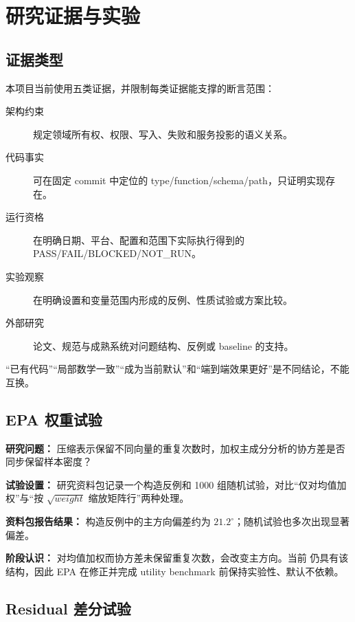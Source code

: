 \chapter{研究证据与实验}

\section{证据类型}

本项目当前使用五类证据，并限制每类证据能支撑的断言范围：

\begin{description}
\item[架构约束] 规定领域所有权、权限、写入、失败和服务投影的语义关系。
\item[代码事实] 可在固定 commit 中定位的 type/function/schema/path，只证明实现存在。
\item[运行资格] 在明确日期、平台、配置和范围下实际执行得到的 PASS/FAIL/BLOCKED/NOT\_RUN。
\item[实验观察] 在明确设置和变量范围内形成的反例、性质试验或方案比较。
\item[外部研究] 论文、规范与成熟系统对问题结构、反例或 baseline 的支持。
\end{description}

“已有代码”“局部数学一致”“成为当前默认”和“端到端效果更好”是不同结论，不能互换。\cite{nous-research-package}

\section{EPA 权重试验}

\textbf{研究问题：} 压缩表示保留不同向量的重复次数时，加权主成分分析的协方差是否同步保留样本密度？

\textbf{试验设置：} 研究资料包记录一个构造反例和 1000 组随机试验，对比“仅对均值加权”与“按 $\sqrt{weight}$ 缩放矩阵行”两种处理。

\textbf{资料包报告结果：} 构造反例中的主方向偏差约为 $21.2^\circ$；随机试验也多次出现显著偏差。

\textbf{阶段认识：} 对均值加权而协方差未保留重复次数，会改变主方向。当前  仍具有该结构，因此 EPA 在修正并完成 utility benchmark 前保持实验性、默认不依赖。\cite{nous-research-package,nous-code-snapshot}

\section{Residual 差分试验}

